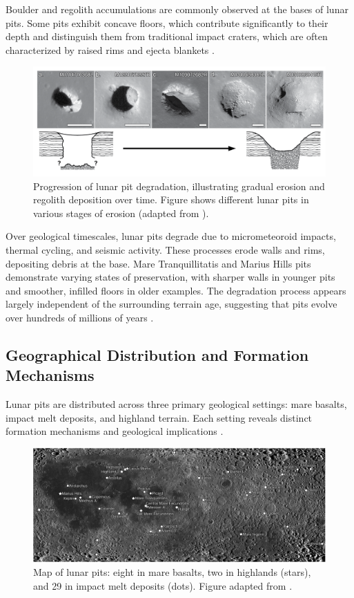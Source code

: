 Boulder and regolith accumulations are commonly observed at the bases of lunar pits. Some pits exhibit concave floors, which contribute significantly to their depth and distinguish them from traditional impact craters, which are often characterized by raised rims and ejecta blankets \cite{lunar-pit-distribution, new-wagner}. 

\begin{figure}[H]
    \centering
    \includegraphics[width=0.85\linewidth]{closed_and_open_cavities.png}
    \caption{Progression of lunar pit degradation, illustrating gradual erosion and regolith deposition over time. Figure shows different lunar pits in various stages of erosion (adapted from \cite{new-wagner}).}
    \label{fig:lunar-pit-degradation}
\end{figure}

Over geological timescales, lunar pits degrade due to micrometeoroid impacts, thermal cycling, and seismic activity. These processes erode walls and rims, depositing debris at the base. Mare Tranquillitatis and Marius Hills pits demonstrate varying states of preservation, with sharper walls in younger pits and smoother, infilled floors in older examples. The degradation process appears largely independent of the surrounding terrain age, suggesting that pits evolve over hundreds of millions of years \cite{lunar-pit-distribution, radar-observations-lava-tubes}.

\subsection{Geographical Distribution and Formation Mechanisms}

Lunar pits are distributed across three primary geological settings: mare basalts, impact melt deposits, and highland terrain. Each setting reveals distinct formation mechanisms and geological implications \cite{lunar-pit-distribution, radar-observations-lava-tubes}.

\begin{figure}[H]
    \centering
    \includegraphics[width=0.76\linewidth]{map-lunar-pits-rough.png}
    \caption{Map of lunar pits: eight in mare basalts, two in highlands (stars), and 29 in impact melt deposits (dots). Figure adapted from \cite{lunar-pit-distribution}.}
    \label{fig:map-lunar-pits}
\end{figure}

